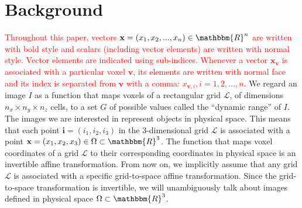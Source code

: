 \section{Background}
\textcolor{red}{Throughout this paper, vectors $\mathbf{x}=(x_{1}, x_{2}, ..., x_{n}) \in \mathbbm{R}^{n}$ are written with bold style and scalars (including vector elements) are written with normal style. Vector elements are indicated using sub-indices. Whenever a vector $\mathbf{x_{v}}$ is associated with a particular voxel $\mathbf{v}$, its elements are written with normal face and its index is separated from $\mathbf{v}$ with a comma: $x_{\mathbf{v}, i}, i=1, 2, ..., n$}. We regard an image $I$ as a function that maps voxels of a rectangular grid \hbox{$\mathcal{L}$}, of dimensions $n_{x} \times n_{y} \times n_{z}$ cells, to a set $G$ of
possible values called the ``dynamic range'' of $I$. The images we are interested in represent objects in physical space. This means that each point $\mathbf{i}=(i_{1},i_{2},i_{3})$ in the
3-dimensional grid $\mathcal{L}$ is associated with a point $\mathbf{x}=(x_{1},x_{2},x_{3}) \in \Omega \subset \mathbbm{R}^{3}$. The function that maps voxel coordinates of a grid $\mathcal{L}$ to their corresponding coordinates in physical space is an invertible affine transformation. From now on, we implicitly assume that any grid $\mathcal{L}$ is associated with a specific grid-to-space affine transformation. Since the grid-to-space transformation is invertible, we will unambiguously talk about images defined in physical space $\Omega \subset \mathbbm{R}^{3}$.\\

\vspace{-0.5cm}
